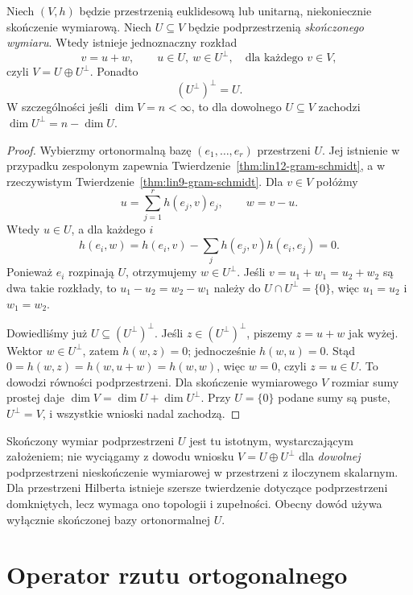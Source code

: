 \begin{twierdzenie}
\label{thm:lin13-rozklad}
Niech \((V,h)\) będzie przestrzenią
euklidesową lub unitarną,
niekoniecznie skończenie wymiarową.
Niech \(U\subseteq V\) będzie
podprzestrzenią \emph{skończonego wymiaru}.
Wtedy istnieje jednoznaczny rozkład
\[
 v=u+w,\qquad u\in U,\ w\in U^\perp,
 \quad\text{dla każdego }v\in V,
\]
czyli \(V=U\oplus U^\perp\).
Ponadto
\[
 (U^\perp)^\perp=U.
\]
W szczególności jeśli \(\dim V=n<\infty\),
to dla dowolnego \(U\subseteq V\)
zachodzi
\(\dim U^\perp=n-\dim U\).
\end{twierdzenie}
\begin{proof}
Wybierzmy ortonormalną bazę
\((e_1,\ldots,e_r)\) przestrzeni \(U\).
Jej istnienie w przypadku zespolonym
zapewnia
Twierdzenie~\ref{thm:lin12-gram-schmidt},
a w rzeczywistym
Twierdzenie~\ref{thm:lin9-gram-schmidt}.
Dla \(v\in V\) połóżmy
\[
 u=\sum_{j=1}^r h(e_j,v)e_j,
 \qquad w=v-u.
\]
Wtedy \(u\in U\), a dla każdego \(i\)
\[
 h(e_i,w)
 =h(e_i,v)-\sum_j h(e_j,v)h(e_i,e_j)=0.
\]
Ponieważ \(e_i\) rozpinają \(U\),
otrzymujemy \(w\in U^\perp\).
Jeśli \(v=u_1+w_1=u_2+w_2\)
są dwa takie rozkłady, to
\(u_1-u_2=w_2-w_1\)
należy do \(U\cap U^\perp=\{0\}\),
więc \(u_1=u_2\) i \(w_1=w_2\).

Dowiedliśmy już
\(U\subseteq(U^\perp)^\perp\).
Jeśli \(z\in(U^\perp)^\perp\),
piszemy \(z=u+w\) jak wyżej.
Wektor \(w\in U^\perp\), zatem
\(h(w,z)=0\); jednocześnie
\(h(w,u)=0\). Stąd
\(0=h(w,z)=h(w,u+w)=h(w,w)\),
więc \(w=0\), czyli \(z=u\in U\).
To dowodzi równości podprzestrzeni.
Dla skończenie wymiarowego \(V\)
rozmiar sumy prostej daje
\(\dim V=\dim U+\dim U^\perp\).
Przy \(U=\{0\}\) podane sumy są puste,
\(U^\perp=V\), i wszystkie wnioski
nadal zachodzą.
\end{proof}

\begin{uwaga}
\label{rem:lin13-nieskonczony}
Skończony wymiar podprzestrzeni \(U\)
jest tu istotnym, wystarczającym założeniem;
nie wyciągamy z dowodu wniosku
\(V=U\oplus U^\perp\) dla \emph{dowolnej}
podprzestrzeni nieskończenie wymiarowej
w przestrzeni z iloczynem skalarnym.
Dla przestrzeni Hilberta istnieje
szersze twierdzenie dotyczące
podprzestrzeni domkniętych,
lecz wymaga ono topologii i zupełności.
Obecny dowód używa wyłącznie
skończonej bazy ortonormalnej \(U\).
\end{uwaga}

\section{Operator rzutu ortogonalnego}
\label{sec:lin13-projekcja}

